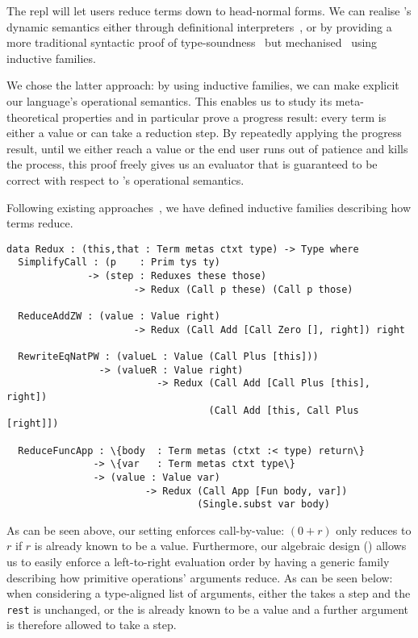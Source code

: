 The \Velo{} \acs*{repl} will let users reduce terms down to head-normal forms.
%
We can realise \Velo{}'s dynamic semantics either through definitional
interpreters~\cite{10.1145/3093333.3009866,Augustsson1999edt},
or by providing a more traditional syntactic proof of
type-soundness~\cite{DBLP:journals/iandc/WrightF94}
but mechanised~\cite[Part 2: Properties]{plfa22.08} using inductive families.

We chose the latter approach: by using inductive families, we can make explicit
our language's operational semantics.
%
This enables us to study its meta-theoretical properties and in particular prove
a progress result: every term is either a value or can take a reduction step.
%
By repeatedly applying the progress result, until we either reach a value or the end
user runs out of patience and kills the process, this proof freely gives us an
evaluator that is guaranteed to be correct with respect to \Velo{}'s operational
semantics.

Following existing approaches~\cite[Part 2: Properties]{plfa22.08}, we have defined
inductive families describing how terms reduce.

\begin{Verbatim}
data Redux : (this,that : Term metas ctxt type) -> Type where
  SimplifyCall : (p    : Prim tys ty)
              -> (step : Reduxes these those)
                      -> Redux (Call p these) (Call p those)

  ReduceAddZW : (value : Value right)
                      -> Redux (Call Add [Call Zero [], right]) right

  RewriteEqNatPW : (valueL : Value (Call Plus [this]))
                -> (valueR : Value right)
                          -> Redux (Call Add [Call Plus [this], right])
                                   (Call Add [this, Call Plus [right]])

  ReduceFuncApp : \{body  : Term metas (ctxt :< type) return\}
               -> \{var   : Term metas ctxt type\}
               -> (value : Value var)
                        -> Redux (Call App [Fun body, var])
                                 (Single.subst var body)
\end{Verbatim}

As can be seen above, our setting enforces call-by-value: $(0 + r)$
only reduces to $r$ if $r$ is already known to be a value.
%
Furthermore, our algebraic design () allows
us to easily enforce a left-to-right evaluation order by having a generic
family describing how primitive operations' arguments reduce.
%
As can be seen below: when considering a type-aligned list of arguments,
either the  takes a step and the \texttt{rest} is unchanged,
or the  is already known to be a value and a further argument
is therefore allowed to take a step.

